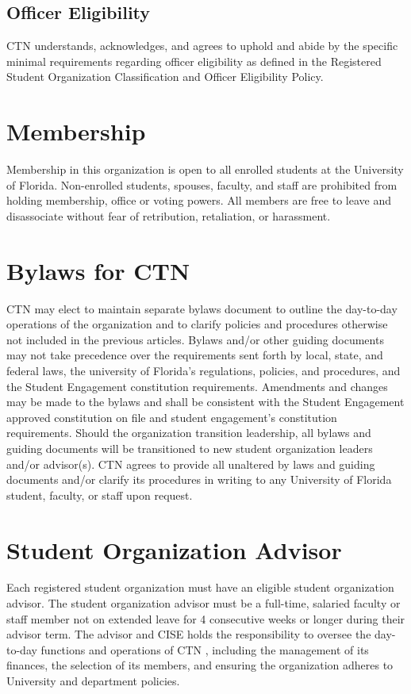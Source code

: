 \documentclass{article}
\def\clubname{CTN }
\begin{document}
\subsection{Officer Eligibility}
\clubname understands, acknowledges, and agrees to uphold and abide by the specific minimal requirements regarding officer eligibility as defined in the Registered Student Organization Classification and Officer Eligibility Policy.


\section{Membership}
Membership in this organization is open to all enrolled students at the University of Florida. Non-enrolled students, spouses, faculty, and staff are prohibited from holding membership, office or voting powers. All members are free to leave and disassociate without fear of retribution, retaliation, or harassment.


\section{Bylaws for \clubname}

\clubname may elect to maintain separate bylaws document to outline the day-to-day operations of the organization and to clarify policies and procedures otherwise not included in the previous articles. Bylaws and/or other guiding documents may not take precedence over the requirements sent forth by local, state, and federal laws, the university of Florida’s regulations, policies, and procedures, and the Student Engagement constitution requirements. Amendments and changes may be made to the bylaws and shall be consistent with the Student Engagement approved constitution on file and student engagement’s constitution requirements. Should the organization transition leadership, all bylaws and guiding documents will be transitioned to new student organization leaders and/or advisor(s). \clubname agrees to provide all unaltered by laws and guiding documents and/or clarify its procedures in writing to any University of Florida student, faculty, or staff upon request.


\section{Student Organization Advisor}
Each registered student organization must have an eligible student organization advisor. The student organization advisor must be a full-time, salaried faculty or staff member not on extended leave for 4 consecutive weeks or longer during their advisor term. The advisor and CISE holds the responsibility to oversee the day-to-day functions and operations of \clubname, including the management of its finances, the selection of its members, and ensuring the organization adheres to University and department policies.
\end{document}
